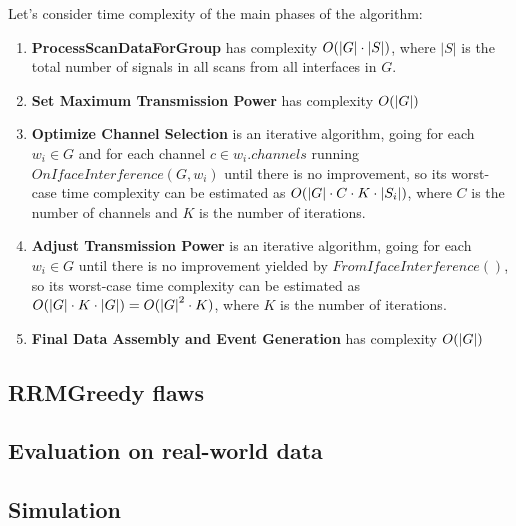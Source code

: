 Let's consider time complexity of the main phases of the algorithm:

\begin{enumerate}
    \item \textbf{ProcessScanDataForGroup} has complexity $O(\lvert{G}\rvert \cdot \lvert S \rvert)$, where $\lvert S \rvert$ is the total number of signals in all scans from all interfaces in $G$.
    \item \textbf{Set Maximum Transmission Power} has complexity $O(\lvert{G}\rvert)$
    \item \textbf{Optimize Channel Selection} is an iterative algorithm, going for each $w_i \in G$ and for each channel $c \in w_i.channels$ running $OnIfaceInterference(G, w_i)$ until there is no improvement, so its worst-case time complexity can be estimated as $O(\lvert{G}\rvert \cdot C \cdot K \cdot \lvert{S_i}\rvert)$, where $C$ is the number of channels and $K$ is the number of iterations.
    \item \textbf{Adjust Transmission Power} is an iterative algorithm, going for each $w_i \in G$ until there is no improvement yielded by $FromIfaceInterference()$, so its worst-case time complexity can be estimated as $O(\lvert{G}\rvert \cdot K \cdot \lvert{G}\rvert) = O({\lvert{G}\rvert}^2 \cdot K)$, where $K$ is the number of iterations.
    \item \textbf{Final Data Assembly and Event Generation} has complexity $O(\lvert{G}\rvert)$
\end{enumerate}

\subsection{RRMGreedy flaws}
\label{sec:flaws}


\subsection{Evaluation on real-world data}
\label{sec:eval}

\subsection{Simulation}
\label{sec:sim}
